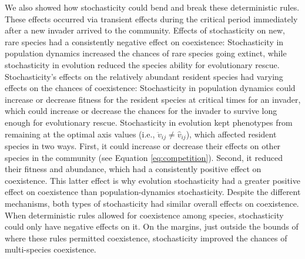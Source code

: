 We also showed how stochasticity could bend and break these deterministic rules.
These effects occurred via transient effects during the critical period
immediately after a new invader arrived to the community.
Effects of stochasticity on new, rare species had a consistently negative
effect on coexistence:
Stochasticity in population dynamics increased the chances of rare species going extinct,
while stochasticity in evolution reduced the species ability for evolutionary rescue.
Stochasticity's effects on the relatively abundant resident species
had varying effects on the chances of coexistence:
Stochasticity in population dynamics could increase or decrease fitness for
the resident species at critical times for an invader, which
could increase or decrease the chances for the invader to survive long enough 
for evolutionary rescue.
Stochasticity in evolution kept phenotypes from remaining at the optimal 
axis values (i.e., $\ddot{v}_{ij} \ne \hat{v}_{ij}$),
which affected resident species in two ways.
First, it could increase or decrease their effects on other species in the community
(see Equation \ref{eq:competition}).
Second, it reduced their fitness and abundance, which had a consistently 
positive effect on coexistence.
This latter effect is why evolution stochasticity had a greater positive effect
on coexistence than population-dynamics stochasticity.
Despite the different mechanisms, both types of stochasticity had similar 
overall effects on coexistence.
When deterministic rules allowed for coexistence among species, 
stochasticity could only have negative effects on it.
On the margins, just outside the bounds of where these rules permitted coexistence, 
stochasticity improved the chances of multi-species coexistence.









